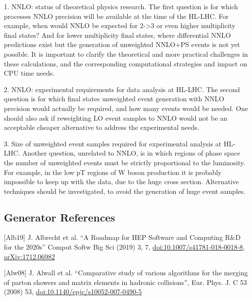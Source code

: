 \documentclass[10pt,a4paper]{article}
\begin{document}
1. {NNLO: status of theoretical physics research}. The first question is
for which processes NNLO precision will be available at the time of the
HL-LHC. For example, when would NNLO be expected for 2-\textgreater3 or
even higher multiplicity final states? And for lower multiplicity final
states, where differential NNLO predictions exist but the generation of
unweighted NNLO+PS events is not yet possible. It is important to
clarify the theoretical and more practical challenges in these
calculations, and the corresponding computational strategies and impact
on CPU time needs.

2. {NNLO: experimental requirements for data analysis at HL-LHC}. The
second question is for which final states unweighted event generation
with NNLO precision would actually be required, and how many events
would be needed. One should also ask if reweighting LO event samples to
NNLO would not be an acceptable cheaper alternative to address the
experimental needs.

3. {Size of unweighted event samples required for experimental analysis
at HL-LHC}. Another question, unrelated to NNLO, is in which regions of
phase space the number of unweighted events must be strictly
proportional to the luminosity. For example, in the low pT regions of W
boson production it is probably impossible to keep up with the data, due
to the huge cross section. Alternative techniques should be
investigated, to avoid the generation of huge event samples.

\subsection{Generator References}\label{references}


{[}Alb19{]} J. Albrecht et al. ``A Roadmap for HEP Software and
Computing R\&D for the 2020s'' Comput Softw Big Sci (2019) 3, 7,
\href{https://doi.org/10.1007/s41781-018-0018-8}{{doi:10.1007/s41781-018-0018-8}},
\href{https://arxiv.org/abs/1712.06982}{{arXiv:1712.06982}}

{[}Alw08{]} J. Alwall et al. ``Comparative study of various algorithms
for the merging of parton showers and matrix elements in hadronic
collisions'', Eur. Phys. J. C 53 (2008) 53,
\href{https://doi.org/10.1140/epjc/s10052-007-0490-5}{{doi:10.1140/epjc/s10052-007-0490-5}}
\end{document}
